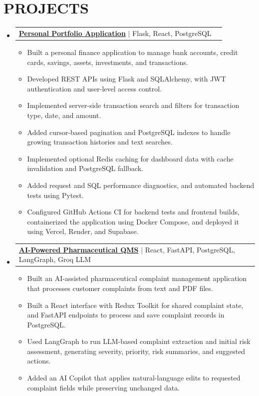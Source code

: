 \documentclass[letterpaper,11pt]{article}
\makeatletter
\newcommand{\resumeItem}[1]{\item\small{#1}}
\newcommand{\resumeProjectHeading}[2]{
  \item
  \begin{tabular*}{\textwidth}{l@{\extracolsep{\fill}}r}
  #1 & #2
  \end{tabular*}
}
\makeatother
\begin{document}
\section{PROJECTS}
\begin{itemize}[leftmargin=0in,label={}]

\resumeProjectHeading
{{\textbf{\large{\underline{Personal Portfolio Application}}}} $|$ Flask, React, PostgreSQL}{}
\begin{itemize}
\resumeItem{Built a personal finance application to manage bank accounts, credit cards, savings, assets, investments, and transactions.}
\resumeItem{Developed REST APIs using Flask and SQLAlchemy, with JWT authentication and user-level access control.}
\resumeItem{Implemented server-side transaction search and filters for transaction type, date, and amount.}
\resumeItem{Added cursor-based pagination and PostgreSQL indexes to handle growing transaction histories and text searches.}
\resumeItem{Implemented optional Redis caching for dashboard data with cache invalidation and PostgreSQL fallback.}
\resumeItem{Added request and SQL performance diagnostics, and automated backend tests using Pytest.}
\resumeItem{Configured GitHub Actions CI for backend tests and frontend builds, containerized the application using Docker Compose, and deployed it using Vercel, Render, and Supabase.}
\end{itemize}

\vspace{3pt}

\resumeProjectHeading
{{\textbf{\large{\underline{AI-Powered Pharmaceutical QMS}}}} $|$ React, FastAPI, PostgreSQL, LangGraph, Groq LLM}{}
\begin{itemize}
\resumeItem{Built an AI-assisted pharmaceutical complaint management application that processes customer complaints from text and PDF files.}
\resumeItem{Built a React interface with Redux Toolkit for shared complaint state, and FastAPI endpoints to process and save complaint records in PostgreSQL.}
\resumeItem{Used LangGraph to run LLM-based complaint extraction and initial risk assessment, generating severity, priority, risk summaries, and suggested actions.}
\resumeItem{Added an AI Copilot that applies natural-language edits to requested complaint fields while preserving unchanged data.}
\end{itemize}

\vspace{3pt}


\end{itemize}
\end{document}
